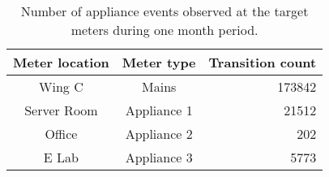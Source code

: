 \begin{table}[htb]
	\centering
	\caption{Number of appliance events observed at the target meters during one month period.}
	\begin{tabular}{@{}ccr@{}}
		Meter location  &  Meter type  &  Transition count \\
	\midrule
		Wing C   &  Mains  &  173842 \\
		Server Room   &  Appliance 1  &  21512 \\
		Office   &  Appliance 2  &  202 \\
		E Lab  &  Appliance 3  &  5773 \\
	\bottomrule
	\end{tabular}
	\label{tab:transition}
\end{table}
